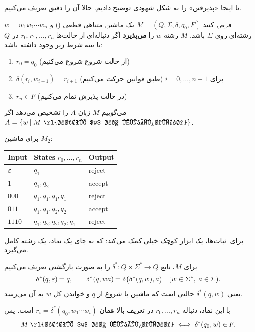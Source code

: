 تا اینجا «پذیرفتن» را به شکل شهودی توضیح دادیم. حالا آن را دقیق تعریف می‌کنیم.

\begin{definition}
فرض کنید $M=(Q,\Sigma,\delta,q_0,F)$ یک ماشین متناهی قطعی () و $w=w_1w_2\cdots w_n$ رشته‌ای روی $\Sigma$ باشد. $M$ رشته $w$ را \textbf{می‌پذیرد} اگر دنباله‌ای از حالت‌ها $r_0,r_1,\dots,r_n$ در $Q$ با سه شرط زیر وجود داشته باشد:
\begin{enumerate}
\item $r_0=q_0$ \hfill (از حالت شروع شروع می‌کنیم)
\item $\delta(r_i,w_{i+1})=r_{i+1}$ برای $i=0,\dots,n-1$ \hfill (طبق قوانین حرکت می‌کنیم)
\item $r_n\in F$ \hfill (در حالت پذیرش تمام می‌کنیم)
\end{enumerate}
می‌گوییم $M$ زبان $A$ را تشخیص می‌دهد اگر $A=\{w\st M\text{ \rl{رشته $w$ را می‌پذیرد}}\}$.
\end{definition}

\begin{example}
برای ماشین $M_2$:
\begin{ltrfig}
\begin{tabular}{lll}
\toprule
Input & States $r_0,\dots,r_n$ & Output\\ \midrule
$\varepsilon$ & $q_1$ & reject\\
$1$ & $q_1,q_2$ & accept\\
$000$ & $q_1,q_1,q_1,q_1$ & reject\\
$011$ & $q_1,q_1,q_2,q_2$ & accept\\
$1110$ & $q_1,q_2,q_2,q_2,q_1$ & reject\\ \bottomrule
\end{tabular}
\end{ltrfig}
\end{example}

برای اثبات‌ها، یک ابزار کوچک خیلی کمک می‌کند:  که به جای یک نماد، یک رشته کامل می‌گیرد.

\begin{definition}
برای  $M$، تابع $\delta^*:Q\times\Sigma^*\to Q$ را به صورت بازگشتی تعریف می‌کنیم:
\[\delta^*(q,\eps)=q,\qquad \delta^*(q,wa)=\delta\big(\delta^*(q,w),a\big)\quad(w\in\Sigma^*,\ a\in\Sigma).\]
یعنی $\delta^*(q,w)$ حالتی است که ماشین با شروع از $q$ و خواندن کل $w$ به آن می‌رسد.
\end{definition}

با این نماد، دنباله $r_0,\dots,r_n$ در تعریف بالا همان $r_i=\delta^*(q_0,w_1\cdots w_i)$ است. پس
\[M\ \text{\rl{رشته $w$ را می‌پذیرد}}\iff \delta^*(q_0,w)\in F.\]

